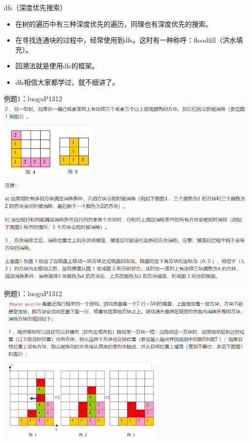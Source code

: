\documentclass{beamer}[UTF-8]
\begin{document}
\begin{frame}{dfs（深度优先搜索）}
  \pause
\begin{itemize}
\item 在树的遍历中有三种深度优先的遍历，同理也有深度优先的搜索。 \pause
\item 在寻找连通块的过程中，经常使用到dfs。这时有一种称呼：floodfill（洪水填充）。 \pause
\item 回溯法就是使用dfs的框架。 \pause
\item dfs相信大家都学过，就不细讲了。
\end{itemize}
\end{frame}

\begin{frame}{例题1：luoguP1312}
\includegraphics[width=\textwidth, height=\textheight]{temp1.png}
\end{frame}

\begin{frame}{例题1：luoguP1312}
\includegraphics{temp2.png}
\end{frame}
\end{document}
